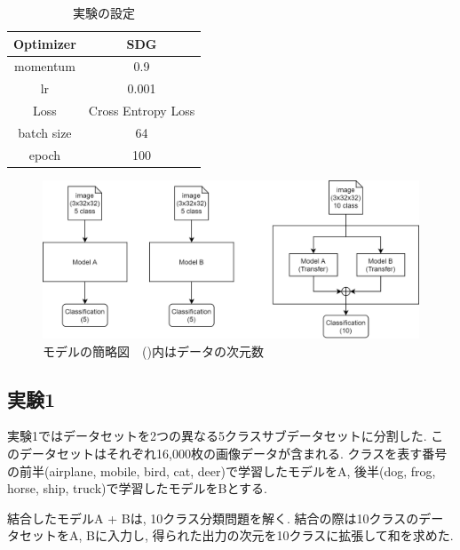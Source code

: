 \documentclass[twocolumn]{jarticle}     %
\begin{document}
\begin{table}[tb]
  \begin{center}
    \caption{実験の設定}
    \begin{tabular}{|c|c|} \hline
      Optimizer & SDG \\ \hline
      momentum & 0.9 \\ \hline
      lr & 0.001 \\ \hline
      Loss & Cross Entropy Loss \\ \hline
      batch size & 64 \\ \hline
      epoch & 100 \\ \hline
    \end{tabular}
    \label{tab:setting}
  \end{center}
\end{table}

\begin{figure}[t]
	\begin{center}
		\includegraphics[clip,width=16cm]{model_figure.png}
		\caption{モデルの簡略図　()内はデータの次元数}
		\label{fig:model}
	\end{center}
\end{figure}

\subsection{実験1}


実験1ではデータセットを2つの異なる5クラスサブデータセットに分割した.
このデータセットはそれぞれ16,000枚の画像データが含まれる.
クラスを表す番号の前半(airplane, mobile, bird, cat, deer)で学習したモデルをA,
後半(dog, frog, horse, ship, truck)で学習したモデルをBとする.

結合したモデルA + Bは, 10クラス分類問題を解く.
結合の際は10クラスのデータセットをA, Bに入力し, 得られた出力の次元を10クラスに拡張して和を求めた.
\end{document}
